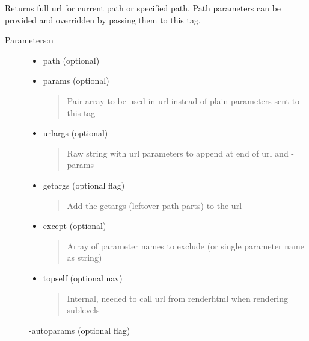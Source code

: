 \documentclass[letterpaper,10pt,english]{sphinxmanual}
\begin{document}
\begin{fulllineitems}

\begin{fulllineitems}
Returns full url for current path or specified path. Path parameters can be provided and overridden by passing them to this tag.
\begin{description}
\item[{Parameters:n}] \leavevmode\begin{itemize}
\item {} 
path (optional)

\item {} 
params (optional)
\begin{quote}

Pair array to be used in url instead of plain parameters sent to this tag
\end{quote}

\item {} 
urlargs (optional)
\begin{quote}

Raw string with url parameters to append at end of url and -params
\end{quote}

\item {} 
getargs (optional flag)
\begin{quote}

Add the getargs (leftover path parts) to the url
\end{quote}

\item {} 
except (optional)
\begin{quote}

Array of parameter names to exclude (or single parameter name as string)
\end{quote}

\item {} 
topself (optional nav)
\begin{quote}

Internal, needed to call url from renderhtml when rendering sublevels
\end{quote}

\end{itemize}

-autoparams (optional flag)
\begin{quote}


\end{quote}
\end{description}
\end{fulllineitems}
\end{fulllineitems}
\end{document}
